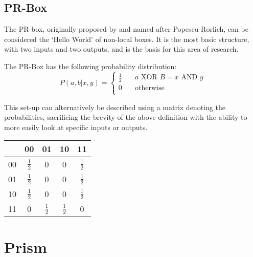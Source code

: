 \documentclass[report.tex]{subfiles}
\begin{document}
\subsection{PR-Box} %
\label{sub:pr_box}
The PR-box, originally proposed by and named after Popescu-Rorlich, can be
considered the `Hello World' of non-local boxes. It is the most basic structure,
with two inputs and two outputs, and is the basis for this area of research.

The PR-Box has the following probability distribution:
\[
    P(a, b | x, y) = 
    \begin{cases}
        \frac{1}{2} & \quad a \text{ XOR } B = x \text{ AND } y \\
        0 & \quad \text{otherwise} \\
    \end{cases}
\]

This set-up can alternatively be described using a matrix denoting the 
probabilities, sacrificing the brevity of the above definition with the ability
to more easily look at specific inputs or outputs.

\begin{center}
\begin{tabular}{l | c c c c}
  & 00 & 01 & 10 & 11 \\
  \hline
  00 & \(\frac{1}{2}\) & 0 & 0 & \(\frac{1}{2}\) \\
  01 & \(\frac{1}{2}\) & 0 & 0 & \(\frac{1}{2}\) \\
  10 & \(\frac{1}{2}\) & 0 & 0 & \(\frac{1}{2}\) \\
  11 & 0 & \(\frac{1}{2}\) & \(\frac{1}{2}\) & 0 \\
\end{tabular}
\end{center}


\section{Prism} %
\label{sec:prism}

\newpage
\end{document}

